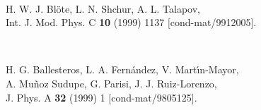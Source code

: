 \documentclass[a4paper,aps,prl,twocolumn,groupedaddress]{revtex4}
\begin{document}
\begin{thebibliography}{10}
~

H. W. J. Bl\"ote, L. N. Shchur, A. L. Talapov,\\
Int. J. Mod. Phys. C {\bf 10} (1999) 1137 $[$cond-mat/9912005$]$.

~

H. G. Ballesteros, L. A. Fern\'andez, V. Mart\'{\i}n-Mayor,\\A. Mu\~noz Sudupe, G. Parisi, J. J. Ruiz-Lorenzo,\\
J. Phys. A {\bf 32} (1999) 1 $[$cond-mat/9805125$]$.

\end{thebibliography}
\end{document}
